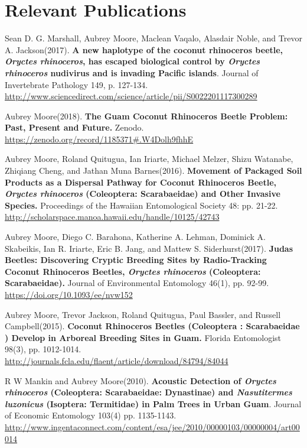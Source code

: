\documentclass[letterpaper]{article}
\begin{document}
\section{Relevant Publications}
\begingroup
	\renewcommand{\section}[2]{}%
\begin{thebibliography}{}
	\bibitem{} Sean D. G. Marshall, Aubrey Moore, Maclean Vaqalo, Alasdair Noble, and Trevor A.
	Jackson(2017). \textbf{A new haplotype of the coconut rhinoceros beetle, \textit{Oryctes rhinoceros},
	has escaped biological control by \textit{Oryctes rhinoceros} nudivirus and is invading
	Pacific islands}. Journal of Invertebrate Pathology 149, p. 127-134. \url{http://www.sciencedirect.com/science/article/pii/S0022201117300289}
	
	\bibitem{} Aubrey Moore(2018). \textbf{The Guam Coconut Rhinoceros Beetle Problem: Past, Present and Future.} Zenodo. \url{https://zenodo.org/record/1185371#.W4Dolh9fhhE}
	
	\bibitem{} Aubrey Moore, Roland Quitugua, Ian Iriarte, Michael Melzer, Shizu Watanabe, Zhiqiang	Cheng, and Jathan Muna Barnes(2016). \textbf{Movement of Packaged Soil Products as a Dispersal Pathway for Coconut Rhinoceros Beetle, \textit{Oryctes rhinoceros} (Coleoptera: Scarabaeidae) and Other Invasive Species.} Proceedings of the Hawaiian Entomological Society 48: pp. 21-22. \url{http://scholarspace.manoa.hawaii.edu/handle/10125/42743}
	
	\bibitem{} Aubrey Moore, Diego C. Barahona, Katherine A. Lehman, Dominick A. Skabeikis,	Ian R. Iriarte, Eric B. Jang, and Mattew S. Siderhurst(2017). \textbf{Judas Beetles: Discovering Cryptic Breeding Sites by Radio-Tracking Coconut Rhinoceros Beetles, \textit{Oryctes
	rhinoceros} (Coleoptera: Scarabaeidae).} Journal of Environmental Entomology 46(1), pp. 92-99. \url{https://doi.org/10.1093/ee/nvw152}
	
	\bibitem{} Aubrey Moore, Trevor Jackson, Roland Quitugua, Paul Bassler, and Russell Campbell(2015). \textbf{Coconut Rhinoceros Beetles (Coleoptera : Scarabaeidae ) Develop in Arboreal Breeding Sites in Guam.} Florida Entomologist 98(3), pp. 1012-1014. 
	\url{http://journals.fcla.edu/flaent/article/download/84794/84044}
	
	\bibitem{} R W Mankin and Aubrey Moore(2010). \textbf{Acoustic Detection of \textit{Oryctes rhinoceros} (Coleoptera: Scarabaeidae: Dynastinae) and \textit{Nasutitermes luzonicus} (Isoptera: Termitidae) in Palm Trees in Urban Guam}. Journal of Economic Entomology 103(4)	pp. 1135-1143. \url{http://www.ingentaconnect.com/content/esa/jee/2010/00000103/00000004/art00014}
	
\end{thebibliography}
\endgroup
\end{document}
